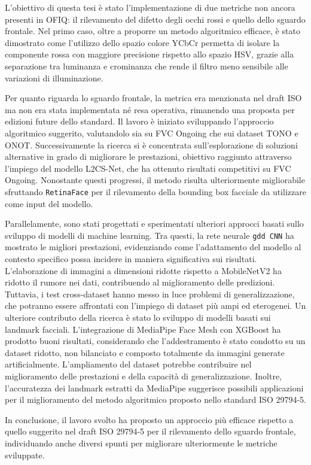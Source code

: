 \documentclass[12pt,a4paper,openright,twoside]{book}
\begin{document}
L'obiettivo di questa tesi è stato l'implementazione di due metriche non ancora presenti in OFIQ: il rilevamento del difetto degli occhi rossi e quello dello sguardo frontale. Nel primo caso, oltre a proporre un metodo algoritmico efficace, è stato dimostrato come l'utilizzo dello spazio colore YCbCr permetta di isolare la componente rossa con maggiore precisione rispetto allo spazio HSV, grazie alla separazione tra luminanza e crominanza che rende il filtro meno sensibile alle variazioni di illuminazione.  

Per quanto riguarda lo sguardo frontale, la metrica era menzionata nel draft ISO ma non era stata implementata né resa operativa, rimanendo una proposta per edizioni future dello standard. Il lavoro è iniziato sviluppando l'approccio algoritmico suggerito, valutandolo sia su FVC Ongoing che sui dataset TONO e ONOT. Successivamente la ricerca si è concentrata sull'esplorazione di soluzioni alternative in grado di migliorare le prestazioni, obiettivo raggiunto attraverso l'impiego del modello L2CS-Net, che ha ottenuto risultati competitivi su FVC Ongoing. Nonostante questi progressi, il metodo risulta ulteriormente migliorabile sfruttando \texttt{RetinaFace} per il rilevamento della bounding box facciale da utilizzare come input del modello.  

Parallelamente, sono stati progettati e sperimentati ulteriori approcci basati sullo sviluppo di modelli di machine learning. Tra questi, la rete neurale \texttt{gdd CNN} ha mostrato le migliori prestazioni, evidenziando come l'adattamento del modello al contesto specifico possa incidere in maniera significativa sui risultati. L'elaborazione di immagini a dimensioni ridotte rispetto a MobileNetV2 ha ridotto il rumore nei dati, contribuendo al miglioramento delle predizioni. Tuttavia, i test cross-dataset hanno messo in luce problemi di generalizzazione, che potranno essere affrontati con l'impiego di dataset più ampi ed eterogenei. 
Un ulteriore contributo della ricerca è stato lo sviluppo di modelli basati sui landmark facciali. L'integrazione di MediaPipe Face Mesh con XGBoost ha prodotto buoni risultati, considerando che l'addestramento è stato condotto su un dataset ridotto, non bilanciato e composto totalmente da immagini generate artificialmente. L'ampliamento del dataset potrebbe contribuire nel miglioramento delle prestazioni e della capacità di generalizzazione. Inoltre, l'accuratezza dei landmark estratti da MediaPipe suggerisce possibili applicazioni per il miglioramento del metodo algoritmico proposto nello standard ISO 29794-5.  

In conclusione, il lavoro svolto ha proposto un approccio più efficace rispetto a quello suggerito nel draft ISO 29794-5 per il rilevamento dello sguardo frontale, individuando anche diversi spunti per migliorare ulteriormente le metriche sviluppate.




\backmatter



\end{document}
